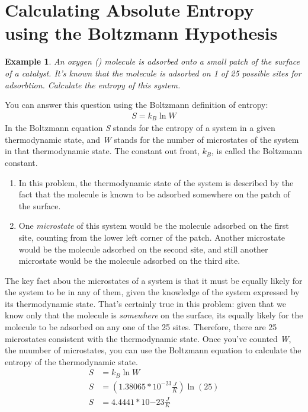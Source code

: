 \documentclass{article}  %
\newtheorem{exmp}{Example}
\begin{document}
\section*{Calculating Absolute Entropy using the Boltzmann Hypothesis}
\begin{exmp}
    An oxygen () molecule is adsorbed onto a small patch of the surface of a catalyst. It's known that the molecule is adsorbed on 1 of 25 possible sites for adsorbtion.
    \newline
    Calculate the entropy of this system.
\end{exmp}
You can answer this question using the Boltzmann definition of entropy:
\begin{equation*}
    \begin{aligned}
        S = k_B \ln W
    \end{aligned}
\end{equation*}
In the Boltzmann equation \emph{S} stands for the entropy of a system in a given thermodynamic state, and \emph{W} stands for the number of microstates of the system in that thermodynamic state. The constant out front, $k_B$, is called the Boltzmann constant.
\begin{enumerate}
    \item In this problem, the thermodynamic state of the system is described by the fact that the  molecule is known to be adsorbed somewhere on the patch of the surface.
    \item One \emph{microstate} of this system would be the  molecule adsorbed on the first site, counting from the lower left corner of the patch. Another microstate would be the molecule adsorbed on the second site, and still another microstate would be the molecule adsorbed on the third site.
\end{enumerate}
The key fact abou the microstates of a system is that it must be equally likely for the system to be in any of them, given the knowledge of the system expressed by its thermodynamic state. That's certainly true in this problem: given that we know only that the molecule is \emph{somewhere} on the surface, its equally likely for the molecule to be adsorbed on any one of the 25 sites. Therefore, there are 25 microstates consistent with the thermodynamic state.
\newline
Once you've counted \emph{W}, the nuumber of microstates, you can use the Boltzmann equation to calculate the entropy of the thermodynamic state.
\begin{equation*}
    \begin{aligned}
        S &= k_B \ln W \\
        S &= (1.38065*10^{-23} \frac{J}{K})\ln (25) \\
        S &= 4.4441 * 10{-23} \frac{J}{K}
    \end{aligned}
\end{equation*} 
\end{document}

